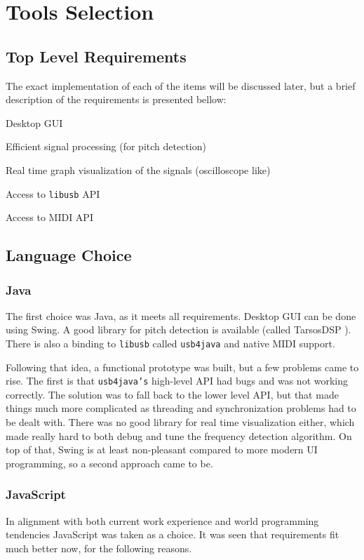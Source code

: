 \section{Tools Selection}
\label{tools-selection}

\subsection{Top Level Requirements}
The exact implementation of each of the items will be discussed later, but
a brief description of the requirements is presented bellow: 
\begin{itemlist}
  \item Desktop GUI
  \item Efficient signal processing (for pitch detection)
  \item Real time graph visualization of the signals (oscilloscope like)
  \item Access to \texttt{libusb} \cite{libusb} API
  \item Access to MIDI API
\end{itemlist}

\subsection{Language Choice}

\subsubsection{Java}
The first choice was Java, as it meets all requirements. Desktop GUI can be done
using Swing. A good library for pitch detection is available (called TarsosDSP \cite{TarsosDSP}).
There is also a binding to \texttt{libusb} called \texttt{usb4java} and native MIDI support. 

Following that idea, a functional prototype was built, but a few problems came to rise.
The first is that \texttt{usb4java's} high-level API had bugs and was not working correctly.
The solution was to fall back to the lower level API, but that made things much
more complicated as threading and synchronization problems had to be dealt with.
There was no good library for
real time visualization either, which made really hard to both debug and tune the
frequency detection algorithm. On top of that, Swing is at least non-pleasant
compared to more modern UI programming, so a second approach came to be.

\subsubsection{JavaScript}
In alignment with both current work experience and world programming tendencies
JavaScript was taken as a choice. It was seen that requirements fit much better now,
for the following reasons. 


